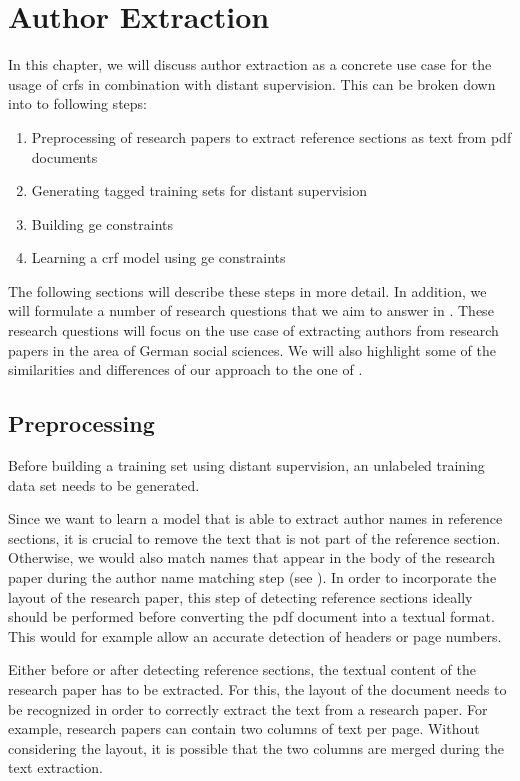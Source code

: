 \chapter{Author Extraction}\label{cha:author-extraction}

In this chapter, we will discuss author extraction as a concrete use case for the usage of \glspl{crf} in combination with \gls{distant supervision}.
This can be broken down into to following steps:
\begin{enumerate}
  \item Preprocessing of research papers to extract reference sections as text from \gls{pdf} documents
  \item Generating tagged training sets for distant supervision
  \item Building \gls{ge} constraints
  \item Learning a \gls{crf} model using \gls{ge} constraints
\end{enumerate}
The following sections will describe these steps in more detail.
In addition, we will formulate a number of research questions that we aim to answer in .
These research questions will focus on the use case of extracting authors from research papers in the area of German social sciences.
We will also highlight some of the similarities and differences of our approach to the one of \citet{lu2013web}.

\section{Preprocessing}\label{sec:ae-preprocessing}

Before building a training set using \gls{distant supervision}, an unlabeled training data set needs to be generated.

Since we want to learn a model that is able to extract author names in reference sections, it is crucial to remove the text that is not part of the reference section.
Otherwise, we would also match names that appear in the body of the research paper during the author name matching step (see ).
In order to incorporate the layout of the research paper, this step of detecting reference sections ideally should be performed before converting the \gls{pdf} document into a textual format.
This would for example allow an accurate detection of headers or page numbers.

\bigskip

Either before or after detecting reference sections, the textual content of the research paper has to be extracted.
For this, the layout of the document needs to be recognized in order to correctly extract the text from a research paper.
For example, research papers can contain two columns of text per page.
Without considering the layout, it is possible that the two columns are merged during the text extraction.

